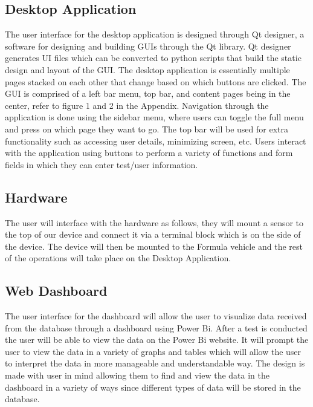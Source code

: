 \documentclass[12pt, titlepage]{article}
\begin{document}
\subsection{Desktop Application}
The user interface for the desktop application is designed through Qt designer, a software for designing and building GUIs through the Qt library. Qt designer generates UI files which can be converted to python scripts that build the static design and layout of the GUI. The desktop application is essentially multiple pages stacked on each other that change based on which buttons are clicked. The GUI is comprised of a left bar menu, top bar, and content pages being in the center, refer to figure 1 and 2 in the Appendix. Navigation through the application is done using the sidebar menu, where users can toggle the full menu and press on which page they want to go. The top bar will be used for extra functionality such as accessing user details, minimizing screen, etc. Users interact with the application using buttons to perform a variety of functions and form fields in which they can enter test/user information.

\subsection{Hardware}
The user will interface with the hardware as follows, they will mount a sensor to the top of our device and connect it via a terminal block which is on the side of the device. The device will then be mounted to the Formula vehicle and the rest of the operations will take place on the Desktop Application.

\subsection{Web Dashboard}
The user interface for the dashboard will allow the user to visualize data received from the database through a dashboard using Power Bi. After a test is conducted the user will be able to view the data on the Power Bi website. It will prompt the user to view the data in a variety of graphs and tables which will allow the user to interpret the data in more manageable and understandable way. The design is made with user in mind allowing them to find and view the data in the dashboard in a variety of ways since different types of data will be stored in the database.



\end{document}
